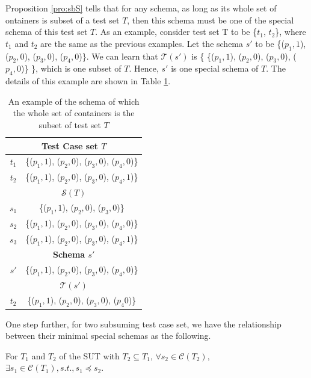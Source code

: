 Proposition \ref{pro:sbS} tells that for any schema, as long as its whole set of ontainers is subset of a test set $T$, then this schema must be one of the special schema of this test set $T$. As an example, consider test set T to be \{$t_{1}$, $t_{2}$\}, where $t_{1}$ and $t_{2}$ are the same as the previous examples. Let the schema $s'$ to be \{($p_{1}, 1$), ($p_{2}, 0$), ($p_{3}, 0$), ($p_{4}, 0$)\}. We can learn that $\mathcal{T}(s')$ is \{ \{($p_{1}, 1$), ($p_{2}, 0$), ($p_{3}, 0$), ($p_{4}, 0$)\} \}, which is one subset of $T$. Hence, $s'$ is one special schema of $T$. The details of this example are shown in Table \ref{ex:wholecontainersofsubsetoftestset}.

\begin{table}[htbp]
  \centering
  \caption{An example of the schema of which the whole set of containers is the subset of test set $T$}
      \label{ex:wholecontainersofsubsetoftestset}
    \begin{tabular}{|c|c|} \hline
  \multicolumn{2}{|c|}{\textbf{Test Case set $T$}} \\ \hline
  $t_{1}$ & \{($p_{1}, 1$), ($p_{2}, 0$), ($p_{3}, 0$), ($p_{4}, 0$)\}\\
  $t_{2}$ & \{($p_{1}, 1$), ($p_{2}, 0$), ($p_{3}, 0$), ($p_{4}, 1$)\}\\ \hline
  \multicolumn{2}{|c|}{\textbf{ $\mathcal{S}(T)$ }}  \\ \hline
  $s_{1}$ & \{($p_{1}, 1$), ($p_{2}, 0$), ($p_{3}, 0$)\}  \\
  $s_{2}$ & \{($p_{1}, 1$), ($p_{2}, 0$), ($p_{3}, 0$), ($p_{4}, 0$)\} \\
  $s_{3}$ & \{($p_{1}, 1$), ($p_{2}, 0$), ($p_{3}, 0$), ($p_{4}, 1$)\} \\ \hline
  \multicolumn{2}{|c|}{\textbf{Schema $s'$}} \\ \hline
  $s'$ & \{($p_{1}, 1$), ($p_{2}, 0$), ($p_{3}, 0$), ($p_{4}, 0$)\}\\ \hline
  \multicolumn{2}{|c|}{\textbf{ $\mathcal{T}(s')$ }}  \\ \hline
  $t_{2}$ & \{($p_{1}, 1$), ($p_{2}, 0$), ($p_{3}, 0$), ($p_{4} 0$)\} \\ \hline
    \end{tabular}%
\end{table}%

One step further, for two subsuming test case set, we have the relationship between their minimal special schemas as the following.

\begin{proposition}\label{pro:ssp}
For $T_{1}$ and $T_{2}$ of the SUT with $T_{2} \subseteq T_{1}$, $\forall s_{2} \in \mathcal{C}(T_{2})$, $\exists s_{1} \in \mathcal{C}(T_{1}), s.t.,  s_{1} \preceq s_{2}.$
\end{proposition}

